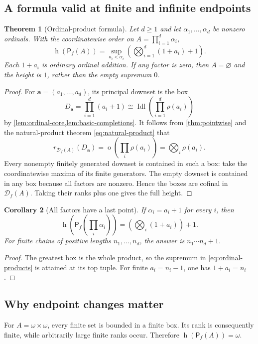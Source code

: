 \documentclass[11pt,letterpaper]{article}
\theoremstyle{teal}
\newtheorem{theorem}{Theorem}[section]
\newtheorem{corollary}[theorem]{Corollary}
\theoremstyle{definition}
\newcommand{\Pf}{\mathsf P_{\!f}}
\newcommand{\Df}{\mathcal D_{\!f}}
\newcommand{\Idl}{\operatorname{Idl}}
\newcommand{\hgt}{\operatorname{h}}
\newcommand{\mot}{\operatorname{o}}
\begin{document}
\subsection{A formula valid at finite and infinite endpoints}
\begin{theorem}[Ordinal-product formula]\label{thm:ordinal-products}
Let $d\geq1$ and let $\alpha_1,\ldots,\alpha_d$ be nonzero ordinals. With the coordinatewise order on $A=\prod_{i=1}^d\alpha_i$,
\begin{equation}\label{eq:ordinal-products}
 \boxed{\displaystyle
 \hgt(\Pf(A))=
 \sup_{a_i<\alpha_i}\left(\bigotimes_{i=1}^d(1+a_i)+1\right).}
\end{equation}
Each $1+a_i$ is ordinary ordinal addition. If any factor is zero, then $A=\varnothing$ and the height is $1$, rather than the empty supremum $0$.
\end{theorem}
\begin{proof}
For $\mathbf a=(a_1,\ldots,a_d)$, its principal downset is the box
\[
 D_{\mathbf a}=\prod_{i=1}^d(a_i+1)
 \cong\Idl\!\left(\prod_{i=1}^d\rho(a_i)\right)
\]
by \cref{lem:ordinal-core,lem:basic-completions}. It follows from \cref{thm:pointwise} and the natural-product theorem \eqref{eq:natural-product} that
\begin{equation}\label{eq:box-rank}
 r_{\Df(A)}(D_{\mathbf a})
 =\mot\!\left(\prod_i\rho(a_i)\right)
 =\bigotimes_i\rho(a_i).
\end{equation}
Every nonempty finitely generated downset is contained in such a box: take the coordinatewise maxima of its finite generators. The empty downset is contained in any box because all factors are nonzero. Hence the boxes are cofinal in $\Df(A)$. Taking their ranks plus one gives the full height.
\end{proof}

\begin{corollary}[All factors have a last point]\label{cor:successors}
If $\alpha_i=a_i+1$ for every $i$, then
\[
 \hgt\!\left(\Pf\!\left(\prod_i\alpha_i\right)\right)
 =\left(\bigotimes_i(1+a_i)\right)+1.
\]
For finite chains of positive lengths $n_1,\ldots,n_d$, the answer is $n_1\cdots n_d+1$.
\end{corollary}
\begin{proof}
The greatest box is the whole product, so the supremum in \eqref{eq:ordinal-products} is attained at its top tuple. For finite $a_i=n_i-1$, one has $1+a_i=n_i$.
\end{proof}

\subsection{Why endpoint changes matter}
For $A=\omega\times\omega$, every finite set is bounded in a finite box. Its rank is consequently finite, while arbitrarily large finite ranks occur. Therefore $\hgt(\Pf(A))=\omega$.
\end{document}

